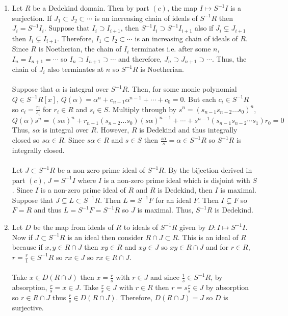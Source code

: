 \documentclass[12pt]{extarticle}
\begin{document}
\begin{enumerate}
\begin{enumerate}
\item Let $R$ be a Dedekind domain. Then by part $(c)$, the map $I \mapsto S^{-1} I$ is a surjection. If $J_1 \subset J_2 \subset \cdots $ is an increasing chain of ideals of $S^{-1}R$ then $J_i = S^{-1}I_i$. Suppose that $I_i \supset I_{i+1}$, then $S^{-1} I_i \supset S^{-1}I_{i+1}$ also if $J_i \subsetneq J_{i+1}$ then $I_i \subsetneq I_{i+1}$. Therefore, $I_1 \subset I_2 \subset \cdots$ is an increasing chain of ideals of $R$. Since $R$ is Noetherian, the chain of $I_i$ terminates i.e. after some $n$, $I_n = I_{n+1} = \cdots$ so $I_n \supset I_{n+1} \supset \cdots$ and therefore, $J_n \supset J_{n+1} \supset \cdots$. Thus, the chain of $J_i$ also terminates at $n$ so $S^{-1} R$ is Noetherian. 
\\ \\
Suppose that $\alpha$ is integral over $S^{-1}R$. Then, for some monic polynomial $Q \in S^{-1}R[x]$, $Q(\alpha) = \alpha^n + c_{n-1} \alpha^{n-1} + \cdots + c_0 = 0$. But each $c_i \in S^{-1}R$ so $c_i = \frac{r_i}{s_i}$ for $r_i \in R$ and $s_i \in S$. Multiply through by $s^n = (s_{n-1} s_{n-2} \dots s_0)^n$, \[Q(\alpha)s^n = (s \alpha)^n + r_{n-1} (s_{n-2} \dots s_0)(s \alpha)^{n-1} + \cdots + s^{n-1}( s_{n-1} s_{n-2} \cdots s_1) r_0 = 0\]
Thus, $s\alpha$ is integral over $R$. However, $R$ is Dedekind and thus integrally closed so $s \alpha \in R$. Since $s \alpha \in R$ and $s \in S$ then $\frac{s \alpha}{s} = \alpha \in S^{-1}R$ so $S^{-1}R$ is integrally closed. 
\\ \\
Let $J \subset S^{-1} R$ be a non-zero prime ideal of $S^{-1}R$. By the bijection derived in part $(c)$, $J = S^{-1}I$ where $I$ is a non-zero prime ideal which is disjoint with $S$. Since $I$ is a non-zero prime ideal of $R$ and $R$ is Dedekind, then $I$ is maximal. Suppose that $J \subsetneq L \subset S^{-1}R$. Then $L = S^{-1} F$ for an ideal $F$. Then $I \subsetneq F$ so $F = R$ and thus $L = S^{-1}F = S^{-1}R$ so $J$ is maximal. Thus, $S^{-1}R$ is Dedekind.   

\item Let $D$ be the map from ideals of $R$ to ideals of $S^{-1}R$ given by $D : I \mapsto S^{-1} I$. Now if $J \subset S^{-1}R$ is an ideal then consider $R \cap J \subset R$. This is an ideal of $R$ because if $x,y \in R \cap J$ then $xy \in R$ and $xy \in J$ so $xy \in R \cap J$ and for $r \in R$, $r = \frac{r}{1} \in S^{-1} R$ so $rx \in J$ so $rx \in R \cap J$. \\ \\
Take $x \in D(R \cap J)$ then $x = \frac{r}{s}$ with $r \in J$ and since $\frac{1}{s} \in S^{-1}R$, by absorption, $\frac{r}{s} = x \in J$. Take $\frac{r}{s} \in J$ with $r \in R$ then $r = s \frac{r}{s} \in J$ by absorption so $r \in R \cap J$ thus $\frac{r}{s} \in D(R \cap J)$. Therefore, $D(R \cap J) = J$ so $D$ is surjective.  \\ \\


\end{enumerate}
\end{enumerate}
\end{document}
